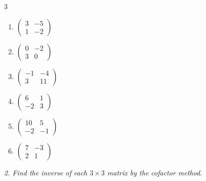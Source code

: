 \begin{multicols}{3}
\begin{enumerate}[label=\arabic*.,  leftmargin=*]
\item $\begin{pmatrix}3&-5\\1&-2\end{pmatrix}$
\item $\begin{pmatrix}0&-2\\3&0\end{pmatrix}$
\item $\begin{pmatrix}-1&-4\\3&11\end{pmatrix}$
\item $\begin{pmatrix}6&1\\-2&3\end{pmatrix}$
\item $\begin{pmatrix}10&5\\-2&-1\end{pmatrix}$
\item $\begin{pmatrix}7&-3\\2&1\end{pmatrix}$
\end{enumerate}
\end{multicols}
\emph{2. Find the inverse of each $3\times 3$ matrix by the cofactor method.}
\bigskip

